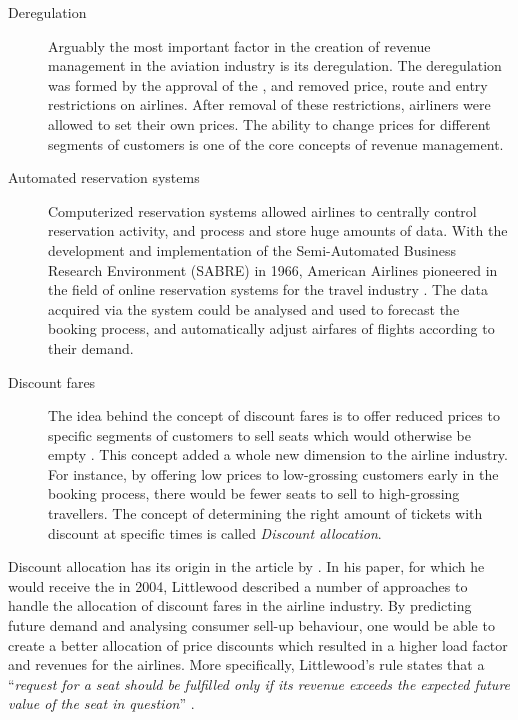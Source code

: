 \begin{description}
\item[Deregulation]
Arguably the most important factor in the creation of revenue management in the aviation industry is its deregulation. The deregulation was formed by the approval of the , and removed price, route and entry restrictions on airlines. After removal of these restrictions, airliners were allowed to set their own prices. The ability to change prices for different segments of customers is one of the core concepts of revenue management.

\item[Automated reservation systems]
Computerized reservation systems allowed airlines to centrally control reservation activity, and process and store huge amounts of data. With the development and implementation of the Semi-Automated Business Research Environment (SABRE) in 1966, American Airlines pioneered in the field of online reservation systems for the travel industry \cite{voneche2005yield}. The data acquired via the system could be analysed and used to forecast the booking process, and automatically adjust airfares of flights according to their demand.

\item[Discount fares]
The idea behind the concept of discount fares is to offer reduced prices to specific segments of customers to sell seats which would otherwise be empty \cite{belobaba1987survey}. This concept added a whole new dimension to the airline industry. For instance, by offering low prices to low-grossing customers early in the booking process, there would be fewer seats to sell to high-grossing travellers. The concept of determining the right amount of tickets with discount at specific times is called \emph{Discount allocation}.
\end{description}

Discount allocation has its origin in the article by . In his paper, for which he would receive the  in 2004, Littlewood described a number of approaches to handle the allocation of discount fares in the airline industry. By predicting future demand and analysing consumer sell-up behaviour, one would be able to create a better allocation of price discounts which resulted in a higher load factor and revenues for the airlines. More specifically, Littlewood's rule states that a ``\textit{request for a seat should be fulfilled only if its revenue exceeds the expected future value of the seat in question}'' \cite[pp. 17]{wright2010dynamic}.

